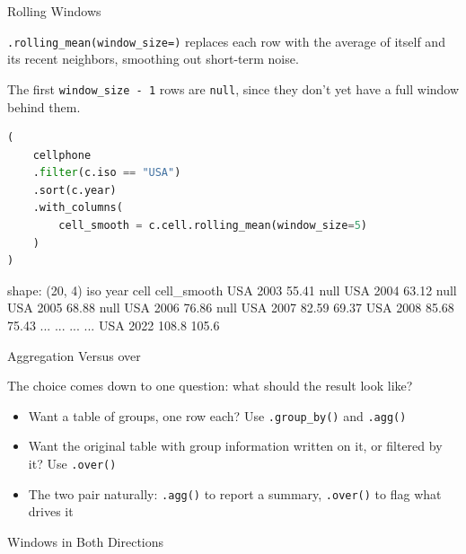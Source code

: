 \documentclass[8pt,aspectratio=169]{beamer}
\begin{document}
\begin{frame}[fragile]{Rolling Windows}
\begin{splitcode}{%

\texttt{.rolling\_mean(window\_size=)} replaces each row with the average of itself and its recent neighbors, smoothing out short-term noise.

The first \texttt{window\_size - 1} rows are \texttt{null}, since they don't yet have a full window behind them.

}
\begin{lstlisting}[language=Python]
(
    cellphone
    .filter(c.iso == "USA")
    .sort(c.year)
    .with_columns(
        cell_smooth = c.cell.rolling_mean(window_size=5)
    )
)
\end{lstlisting}
\begin{codeoutput}
shape: (20, 4)
iso  year  cell    cell_smooth
USA  2003  55.41   null
USA  2004  63.12   null
USA  2005  68.88   null
USA  2006  76.86   null
USA  2007  82.59   69.37
USA  2008  85.68   75.43
...  ...   ...     ...
USA  2022  108.8   105.6
\end{codeoutput}
\end{splitcode}
\end{frame}

\begin{textframe}{Aggregation Versus over}

The choice comes down to one question: what should the result look like?

\begin{itemize}
\item Want a table of groups, one row each? Use \texttt{.group\_by()} and \texttt{.agg()}
\item Want the original table with group information written on it, or filtered by it? Use \texttt{.over()}
\item The two pair naturally: \texttt{.agg()} to report a summary, \texttt{.over()} to flag what drives it
\end{itemize}

\end{textframe}

\begin{rightframe}{Windows in Both Directions}
\end{rightframe}
\end{document}
